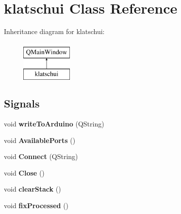 \hypertarget{classklatschui}{}\section{klatschui Class Reference}
\label{classklatschui}
Inheritance diagram for klatschui\+:\begin{figure}[H]
\begin{center}
\leavevmode
\includegraphics[height=2.000000cm]{classklatschui}
\end{center}
\end{figure}
\subsection*{Signals}
\begin{DoxyCompactItemize}
\item 
void {\bfseries write\+To\+Arduino} (Q\+String)\hypertarget{classklatschui_a2a8a15e0a55ffa93ba14b9552626b8fc}{}\label{classklatschui_a2a8a15e0a55ffa93ba14b9552626b8fc}

\item 
void {\bfseries Available\+Ports} ()\hypertarget{classklatschui_abadb649b4813dbd1fba38b4ee5014112}{}\label{classklatschui_abadb649b4813dbd1fba38b4ee5014112}

\item 
void {\bfseries Connect} (Q\+String)\hypertarget{classklatschui_a6b2513c6d27721571a2c7c599a99ce72}{}\label{classklatschui_a6b2513c6d27721571a2c7c599a99ce72}

\item 
void {\bfseries Close} ()\hypertarget{classklatschui_a91294854654b4008c24cdaa57005a7bc}{}\label{classklatschui_a91294854654b4008c24cdaa57005a7bc}

\item 
void {\bfseries clear\+Stack} ()\hypertarget{classklatschui_a667a110e7e27d635130f0253f5ffd7e7}{}\label{classklatschui_a667a110e7e27d635130f0253f5ffd7e7}

\item 
void {\bfseries fix\+Processed} ()\hypertarget{classklatschui_a744a34ae576dd7d7fdc18f87a002cf94}{}\label{classklatschui_a744a34ae576dd7d7fdc18f87a002cf94}

\end{DoxyCompactItemize}
